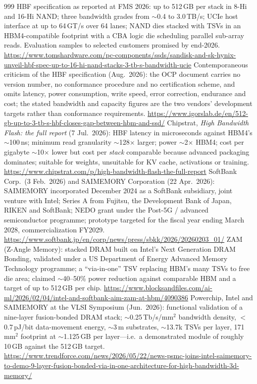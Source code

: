 \begin{thebibliography}{999}
 HBF specification as reported at FMS 2026: up to 512\,GB per stack in 8-Hi and 16-Hi NAND; three bandwidth grades from $\sim$0.4 to 3.0\,TB/s; UCIe host interface at up to 64\,GT/s over 64 lanes; NAND dies stacked with TSVs in an HBM4-compatible footprint with a CBA logic die scheduling parallel sub-array reads. Evaluation samples to selected customers promised by end-2026. \url{https://www.tomshardware.com/pc-components/ssds/sandisk-and-sk-hynix-unveil-hbf-spec-up-to-16-hi-nand-stacks-3-tb-s-bandwidth-ucie}
 Contemporaneous criticism of the HBF specification (Aug.\ 2026): the OCP document carries no version number, no conformance procedure and no certification scheme, and omits latency, power consumption, write speed, error correction, endurance and cost; the stated bandwidth and capacity figures are the two vendors' development targets rather than conformance requirements. \url{https://www.igorslab.de/en/512-gb-up-to-3-tb-s-hbf-closes-gap-between-hbm-and-ssd/}
 Chipstrat, \emph{High Bandwidth Flash: the full report} (7 Jul.\ 2026): HBF latency in microseconds against HBM4's $\sim$100\,ns; minimum read granularity $\sim$128$\times$ larger; power $\sim$2$\times$ HBM4; cost per gigabyte $\sim$10$\times$ lower but cost per \emph{stack} comparable because advanced packaging dominates; suitable for weights, unsuitable for KV cache, activations or training. \url{https://www.chipstrat.com/p/high-bandwidth-flash-the-full-report}
 SoftBank Corp.\ (3 Feb.\ 2026) and SAIMEMORY Corporation (22 Apr.\ 2026): SAIMEMORY incorporated December 2024 as a SoftBank subsidiary, joint venture with Intel; Series A from Fujitsu, the Development Bank of Japan, RIKEN and SoftBank; NEDO grant under the Post-5G / advanced semiconductor programme; prototype targeted for the fiscal year ending March 2028, commercialization FY2029. \url{https://www.softbank.jp/en/corp/news/press/sbkk/2026/20260203_01/}
 ZAM (Z-Angle Memory): stacked DRAM built on Intel's Next Generation DRAM Bonding, validated under a US Department of Energy Advanced Memory Technology programme; a ``via-in-one'' TSV replacing HBM's many TSVs to free die area; claimed $\sim$40--50\% power reduction against comparable HBM and a target of up to 512\,GB per chip. \url{https://www.blocksandfiles.com/ai-ml/2026/02/04/intel-and-softbank-aim-zam-at-hbm/4090386}
 Powerchip, Intel and SAIMEMORY at the VLSI Symposium (Jun.\ 2026): functional validation of a nine-layer fusion-bonded DRAM stack; $\sim$0.25\,Tb/s/mm$^2$ bandwidth density, $<$0.7\,pJ/bit data-movement energy, $\sim$3\,\textmu m substrates, $\sim$13.7k TSVs per layer, 171\,mm$^2$ footprint at $\sim$1.125\,GB per layer---i.e.\ a demonstrated module of roughly 10\,GB against the 512\,GB target. \url{https://www.trendforce.com/news/2026/05/22/news-psmc-joins-intel-saimemory-to-demo-9-layer-fusion-bonded-via-in-one-architecture-for-high-bandwidth-3d-memory/}

\end{thebibliography}
